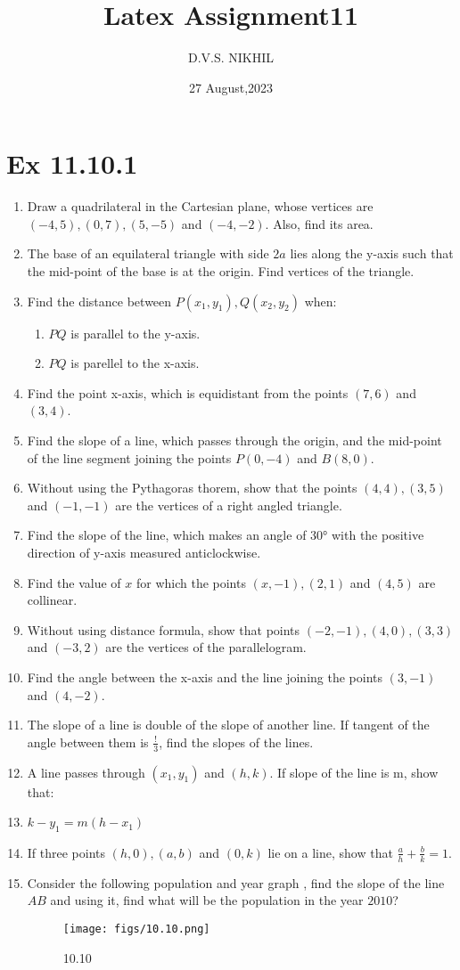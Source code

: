 \documentclass{article}
\theoremstyle{remark}
\begin{document}
\title{Latex Assignment11}
\author{D.V.S. NIKHIL}
\date{27 August,2023}
\maketitle
\section*{Ex 11.10.1}
\begin{enumerate}
\item Draw a quadrilateral in the Cartesian plane, whose vertices are $(-4,5), (0,7), (5,-5)$ and $(-4,-2)$. Also, find its area.
\item The base of an equilateral triangle with side $2a$ lies along the y-axis such that the mid-point of the base is at the origin. Find vertices of the triangle.
\item Find the distance between $P(x_1,y_1),Q(x_2,y_2)$ when:
\begin{enumerate}[label=(\roman*)]
\item $PQ$ is parallel to the y-axis.
\item $PQ$ is parellel to the x-axis.
\end{enumerate}
\item Find the point x-axis, which is equidistant from the points $(7,6)$ and $(3,4)$.
\item Find the slope of a line, which passes through the origin, and the mid-point of the line segment joining the points $P(0,-4)$ and $B(8,0)$.
\item Without using the Pythagoras thorem, show that the points $(4,4), (3,5)$ and $(-1,-1)$ are the vertices of a right angled triangle.
\item Find the slope of the line, which makes an angle of 30° with the positive  direction of y-axis measured anticlockwise.
\item Find the value of $x$ for which the points $(x,-1), (2,1)$ and $(4,5)$ are collinear.
\item Without using distance formula, show that points $(-2,-1), (4,0), (3,3)$ and $(-3,2)$ are the vertices of the parallelogram.
\item Find the angle between the x-axis and the line joining the points $(3,-1)$ and $(4,-2)$.
\item The slope of a line is double of the slope of another line. If tangent of the angle between them is $\frac{!}{3}$, find the slopes of the lines.
\item A line passes through $(x_1,y_1)$ and $(h,k)$. If slope of the line is m, show that:
\item $k-y_1= m(h-x_1)$
\item If three points $(h,0), (a,b)$ and $(0,k)$ lie on a line, show that $\frac{a}{h}+\frac{b}{k}=1$.
\item Consider the following population and year graph  , find the slope of the line $AB$ and using it, find what will be the population in the year $2010$?
\begin{figure}[ht]
\centering
\texttt{[image: figs/10.10.png]}
\caption{10.10}
\label{fig:10.10}
\end{figure}
\end{enumerate}
\end{document}
